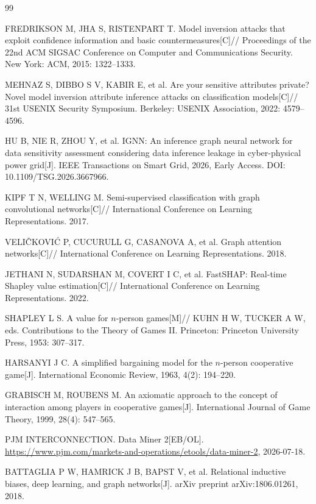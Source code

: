 \begin{thebibliography}{99}
\small

FREDRIKSON M, JHA S, RISTENPART T.
Model inversion attacks that exploit confidence information and basic countermeasures[C]//
Proceedings of the 22nd ACM SIGSAC Conference on Computer and Communications Security.
New York: ACM, 2015: 1322--1333.

MEHNAZ S, DIBBO S V, KABIR E, et al.
Are your sensitive attributes private? Novel model inversion attribute inference attacks on classification models[C]//
31st USENIX Security Symposium.
Berkeley: USENIX Association, 2022: 4579--4596.

HU B, NIE R, ZHOU Y, et al.
IGNN: An inference graph neural network for data sensitivity assessment considering data inference leakage in cyber-physical power grid[J].
IEEE Transactions on Smart Grid, 2026, Early Access.
DOI: 10.1109/TSG.2026.3667966.

KIPF T N, WELLING M.
Semi-supervised classification with graph convolutional networks[C]//
International Conference on Learning Representations.
2017.

VELI\v{C}KOVI\'C P, CUCURULL G, CASANOVA A, et al.
Graph attention networks[C]//
International Conference on Learning Representations.
2018.

JETHANI N, SUDARSHAN M, COVERT I C, et al.
FastSHAP: Real-time Shapley value estimation[C]//
International Conference on Learning Representations.
2022.

SHAPLEY L S.
A value for $n$-person games[M]//
KUHN H W, TUCKER A W, eds.
Contributions to the Theory of Games II.
Princeton: Princeton University Press, 1953: 307--317.

HARSANYI J C.
A simplified bargaining model for the $n$-person cooperative game[J].
International Economic Review, 1963, 4(2): 194--220.

GRABISCH M, ROUBENS M.
An axiomatic approach to the concept of interaction among players in cooperative games[J].
International Journal of Game Theory, 1999, 28(4): 547--565.

PJM INTERCONNECTION.
Data Miner 2[EB/OL].
\url{https://www.pjm.com/markets-and-operations/etools/data-miner-2},
2026-07-18.

BATTAGLIA P W, HAMRICK J B, BAPST V, et al.
Relational inductive biases, deep learning, and graph networks[J].
arXiv preprint arXiv:1806.01261, 2018.


\end{thebibliography}
